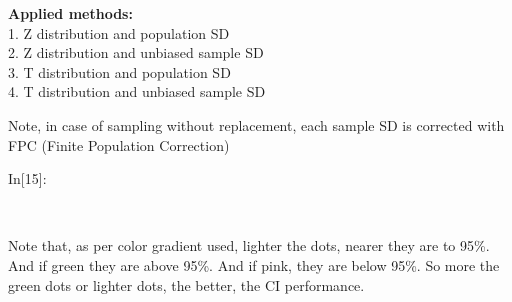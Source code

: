 \documentclass[float=false,crop=false]{standalone}
\begin{document}
\textbf{Applied methods:}\\
1. Z distribution and population SD\\
2. Z distribution and unbiased sample SD\\
3. T distribution and population SD\\
4. T distribution and unbiased sample SD

Note, in case of sampling without replacement, each sample SD is
corrected with FPC (Finite Population Correction)
\begin{InVerbatim}[commandchars=\\\{\},fontsize=\scriptsize]
{\color{incolor}In[{\color{incolor}15}]:}     
           
             
         
         
           
\end{InVerbatim}
    \begin{center}
    \end{center}
    { \hspace*{\fill} \\}
    
    Note that, as per color gradient used, lighter the dots, nearer they are
to 95\%. And if green they are above 95\%. And if pink, they are below
95\%. So more the green dots or lighter dots, the better, the CI
performance.
\end{document}
